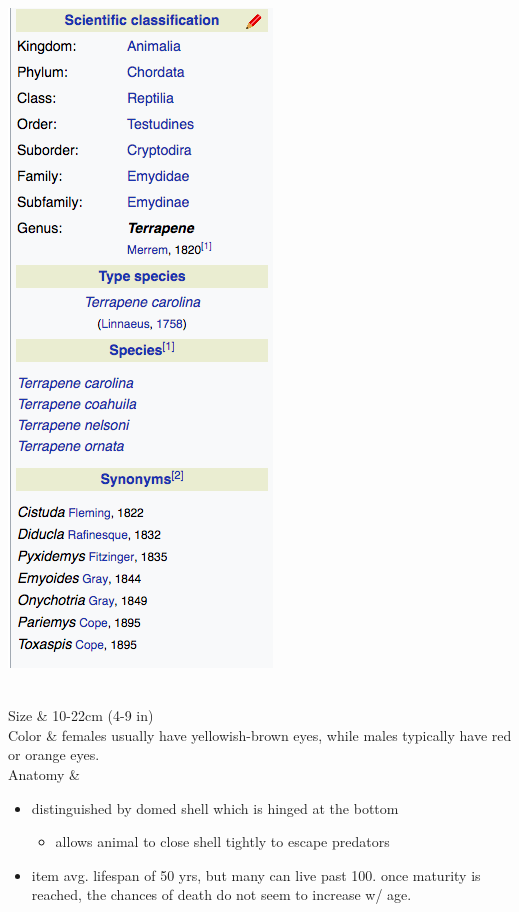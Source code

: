 \begin{center}
\begin{longtabu}
	\begin{center} \includegraphics[scale=0.25]{testudines/emydidae/terrapene/tax} \end{center}
	 \\
	\hline
	Size & 
	10-22cm (4-9 in)
	\\
	\hline
	Color &
	females usually have yellowish-brown eyes, while males typically have red or orange eyes.
	 \\
	\hline
	Anatomy &
	\begin{itemize}[noitemsep]
		\item distinguished by domed shell which is hinged at the bottom
			\begin{itemize}[noitemsep]
				\item allows animal to close shell tightly to escape predators
			\end{itemize}
		\item item avg. lifespan of 50 yrs, but many can live past 100. once maturity is reached, the chances of death do not seem to increase w/ age.

\end{itemize}
\end{longtabu}
\end{center}
